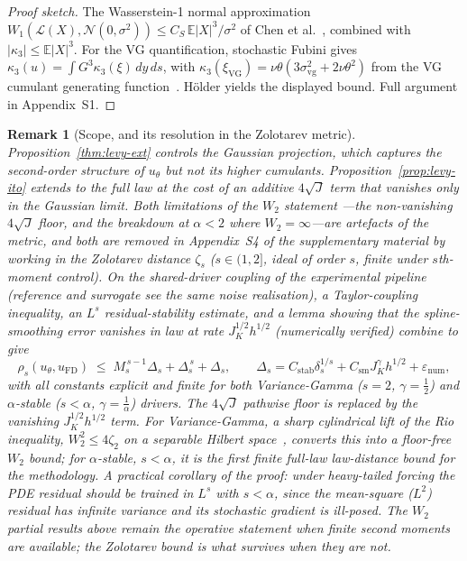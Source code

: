 \documentclass[review,12pt]{elsarticle}
\newtheorem{remark}{Remark}
\begin{document}
\begin{proof}[Proof sketch]
The Wasserstein-1 normal approximation
$W_1(\mathcal L(X), \mathcal N(0,\sigma^2))
\le C_S\,\mathbb E|X|^3/\sigma^2$
of Chen et al.~\citep[Thm.~3.1]{ChenGoldsteinShao2011}, combined with
$|\kappa_3| \le \mathbb E|X|^3$. For the VG quantification, stochastic
Fubini gives $\kappa_3(u) = \int G^3 \kappa_3(\xi)\,dy\,ds$, with
$\kappa_3(\xi_{\mathrm{VG}}) = \nu\theta(3\sigma_{\mathrm{vg}}^2 +
2\nu\theta^2)$ from the VG cumulant generating
function~\citep{MadanCarrChang1998,ContTankov2003}. H\"older yields the
displayed bound. Full argument in Appendix~S1.
\end{proof}

\begin{remark}[Scope, and its resolution in the Zolotarev metric]\label{rem:nongauss-scope}
Proposition~\ref{thm:levy-ext} controls the Gaussian projection,
which captures the second-order structure of $u_\theta$ but not its
higher cumulants. Proposition~\ref{prop:levy-ito} extends to the
full law at the cost of an additive $4\sqrt J$ term that vanishes
only in the Gaussian limit. Both limitations of the $W_2$ statement
---the non-vanishing $4\sqrt J$ floor, and the breakdown at
$\alpha < 2$ where $W_2 = \infty$---are artefacts of the metric, and
both are removed in Appendix~S4 of the supplementary material by
working in the Zolotarev distance $\zeta_s$ ($s \in (1,2]$, ideal of
order $s$, finite under $s$th-moment control). On the shared-driver
coupling of the experimental pipeline (reference and surrogate see the
same noise realisation), a Taylor-coupling inequality, an $L^s$
residual-stability estimate, and a lemma showing that the
spline-smoothing error vanishes \emph{in law} at rate
$J_K^{1/2}h^{1/2}$ (numerically verified) combine to give
\[
\rho_s(u_\theta, u_{\mathrm{FD}}) \;\le\;
M_s^{\,s-1}\Delta_s + \Delta_s^{\,s} + \Delta_s,
\qquad
\Delta_s = C_{\mathrm{stab}}\delta_s^{1/s}
+ C_{\mathrm{sm}}J_K^{\gamma}h^{1/2} + \varepsilon_{\mathrm{num}},
\]
with all constants explicit and finite for both Variance-Gamma
($s=2$, $\gamma=\tfrac12$) and $\alpha$-stable ($s<\alpha$,
$\gamma=\tfrac1\alpha$) drivers. The $4\sqrt J$ pathwise floor is
replaced by the vanishing $J_K^{1/2}h^{1/2}$ term. For Variance-Gamma,
a sharp cylindrical lift of the Rio inequality,
$W_2^2 \le 4\zeta_2$ on a separable Hilbert
space~\citep{BolbotowskiBouchitte2025}, converts this into a
floor-free $W_2$ bound; for $\alpha$-stable, $s < \alpha$, it is the
first finite full-law law-distance bound for the methodology. A
practical corollary of the proof: under heavy-tailed forcing the PDE
residual should be trained in $L^s$ with $s < \alpha$, since the
mean-square ($L^2$) residual has infinite variance and its stochastic
gradient is ill-posed. The $W_2$ partial results above remain the
operative statement when finite second moments are available; the
Zolotarev bound is what survives when they are not.
\end{remark}
\end{document}
